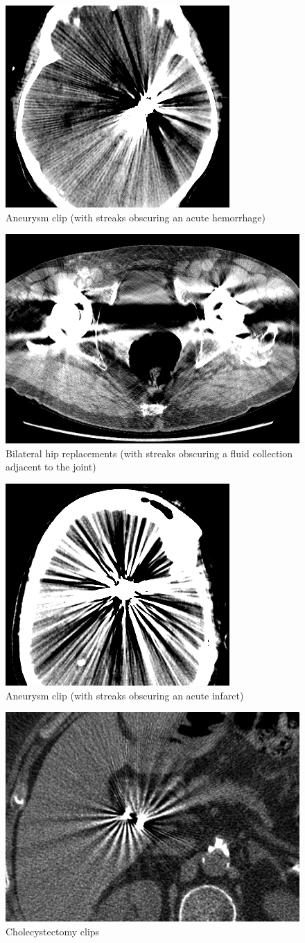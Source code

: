 \begin{figure}[h!]
	\centering
	\includegraphics[width=0.5\linewidth]{images/15_FBP.png}
	\caption{Aneurysm clip (with streaks obscuring an acute hemorrhage)\cite{revisionrads}}
\end{figure}
\begin{figure}[h!]
	\centering
	\includegraphics[width=0.5\linewidth]{images/14_FBP.png}
	\caption{Bilateral hip replacements (with streaks obscuring a fluid collection adjacent to the joint)\cite{revisionrads}}
\end{figure}
\begin{figure}[h!]
	\centering
	\includegraphics[width=0.5\linewidth]{images/13_FBP.png}
	\caption{Aneurysm clip (with streaks obscuring an acute infarct)\cite{revisionrads}}
\end{figure}
\begin{figure}[h!]
	\centering
	\includegraphics[width=0.5\linewidth]{images/11_FBP.png}
	\caption{Cholecystectomy clips\cite{revisionrads}}
\end{figure}
